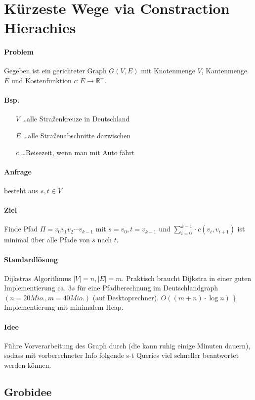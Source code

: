\section{Kürzeste Wege via Constraction Hierachies}

\paragraph*{Problem} Gegeben ist ein gerichteter Graph $G(V,E)$ mit Knotenmenge $V$, Kantenmenge $E$ und Kostenfunktion $c:E \rightarrow \mathbb{R}^+$.

\paragraph*{Bsp.}
\begin{itemize}
	\item[$V$] \dots alle Straßenkreuze in Deutschland
	\item[$E$] \dots alle Straßenabschnitte dazwischen
	\item[$c$] \dots Reisezeit, wenn man mit Auto fährt
\end{itemize}

\paragraph*{Anfrage} besteht aus $s,t \in V$

\paragraph*{Ziel} Finde Pfad $\Pi = v_0v_1v_2 \cdots v_{k-1}$ mit $s=v_0, t=v_{k-1}$ und $\sum\limits_{i=0}^{k-1} \cdot c(v_i,v_{i+1})$ ist minimal über alle Pfade von $s$ nach $t$.

\paragraph*{Standardlösung} Dijkstras Algorithmus $|V|=n,|E|=m$. Praktisch braucht Dijkstra in einer guten Implementierung ca. $3s$ für eine Pfadberechnung im Deutschlandgraph $(n=20 Mio., m= 40 Mio.)$ (auf Desktoprechner). $O((m+n) \cdot \log n)$ \} Implementierung mit minimalem Heap.

\paragraph*{Idee} Führe Vorverarbeitung des Graph durch (die kann ruhig einige Minuten dauern), sodass mit vorberechneter Info folgende s-t Queries viel schneller beantwortet werden können.

\subsection{Grobidee}

